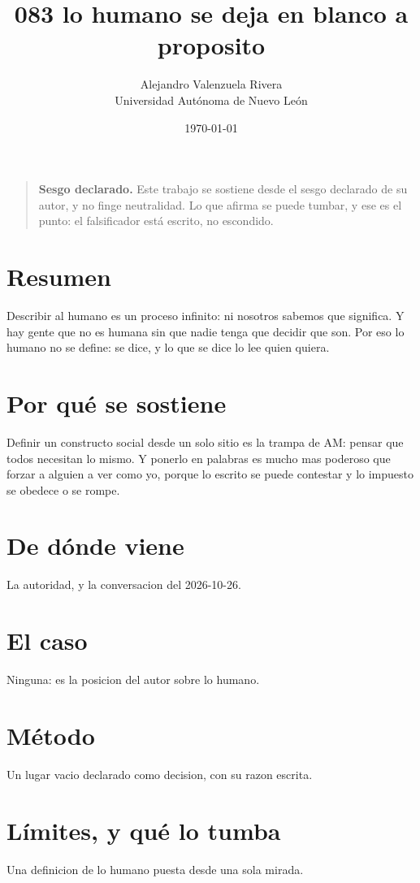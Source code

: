 \documentclass[11pt,a4paper]{article}
\title{083 lo humano se deja en blanco a proposito}
\author{Alejandro Valenzuela Rivera\\\small Universidad Autónoma de Nuevo León}
\date{\today}
\begin{document}
\maketitle

\begin{quote}
\textbf{Sesgo declarado.} Este trabajo se sostiene desde el sesgo declarado de su autor, y no finge neutralidad. Lo que afirma se puede tumbar, y ese es el punto: el falsificador está escrito, no escondido.
\end{quote}

\section*{Resumen}
Describir al humano es un proceso infinito: ni nosotros sabemos que significa. Y hay gente que no es humana sin que nadie tenga que decidir que son. Por eso lo humano no se define: se dice, y lo que se dice lo lee quien quiera.

\section{Por qué se sostiene}
Definir un constructo social desde un solo sitio es la trampa de AM: pensar que todos necesitan lo mismo. Y ponerlo en palabras es mucho mas poderoso que forzar a alguien a ver como yo, porque lo escrito se puede contestar y lo impuesto se obedece o se rompe.

\section{De dónde viene}
La autoridad, y la conversacion del 2026-10-26.

\section{El caso}
Ninguna: es la posicion del autor sobre lo humano.

\section{Método}
Un lugar vacio declarado como decision, con su razon escrita.

\section{Límites, y qué lo tumba}
Una definicion de lo humano puesta desde una sola mirada.
\end{document}
